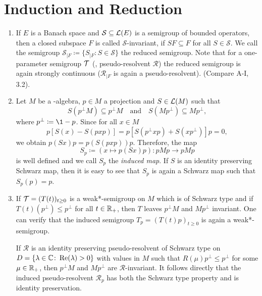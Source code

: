 \section{Induction and Reduction}
\begin{enumerate}[1., wide, labelsep=1em]
\item
If $ E $ is a Banach space and $ \mathcal{S} \subseteq \mathcal{L}(E) $ is a semigroup of bounded operators, then a closed subspace $ F $ is called $ \mathcal{S} $-invariant, if $ SF \subseteq F $ for all $ S \in \mathcal{S} $.
We call the semigroup $ \mathcal{S}_{\vert F} \coloneqq \{S_{\vert F} \colon S \in \mathcal{S} \} $ the reduced semigroup.
Note that for a one-parameter semigroup $ \mathcal{T} $ (\resp, pseudo-resolvent $ \mathcal{R} $) the reduced semigroup is again strongly continuous (\resp $ \mathcal{R}_{\vert F} $ is again a pseudo-resolvent). (Compare A-I, 3.2).

\item
Let $ M $ be a \WA-algebra, $ p \in M $ a projection and $ S \in \mathcal{L}(M) $ such that 
%
\[
	S( p^{\perp}M ) \subseteq p^{\perp}M 
	\quad \text{and} \quad 
	S( Mp^{\perp} ) \subseteq Mp^{\perp} ,  
\]
%
where $ p^{\perp} \coloneqq \1-p $.
Since for all $ x \in M $
\[
p[S(x) - S(pxp)] = p[S(p^{\perp}xp) + S(xp^{\perp})]p = 0,
\]
we obtain $ p(Sx)p = p(S(pxp))p $.
Therefore, the map
\[
S_{p} \coloneqq (x \mapsto p(Sx)p) \colon pMp \to pMp
\]
is well defined and we call $ S_{p} $ the \emph{induced map}.
If $ S $ is an identity preserving Schwarz map, then it is easy to see that $ S_{p} $ is again a Schwarz map such that $ S_{p}(p) = p $.

\item
If $ \mathcal{T} = (T(t))_{t\geq0} $ is a weak*-semigroup on $ M $ which is of Schwarz type and if $ T(t)(p^{\perp}) \leq p^{\perp} $ for all $ t \in \mathbb{R}_{+} $, then $ T $ leaves $ p^{\perp}M $ and $ Mp^{\perp} $ invariant.
One can verify that the induced semigroup $T_p = (T(t)p)_{t \geq 0}$ is again a weak*-semigroup.

If  $ \mathcal{R} $ is an identity preserving pseudo-resolvent of Schwarz type on $ D = \{\lambda \in \mathbb{C} \colon \mathop{}\!\mathrm{Re}(\lambda) > 0\} $ with values in $ M $ such that $ R(\mu)p^{\perp} \leq p^{\perp} $ for some $ \mu \in \mathbb{R}_{+} $, then $ p^{\perp}M $ and $ Mp^{\perp} $ are  $ \mathcal{R} $-invariant.
It follows directly that the induced pseudo-resolvent $ \mathcal{R}_p$ has both the Schwarz type property and is identity preservation.


\end{enumerate}
